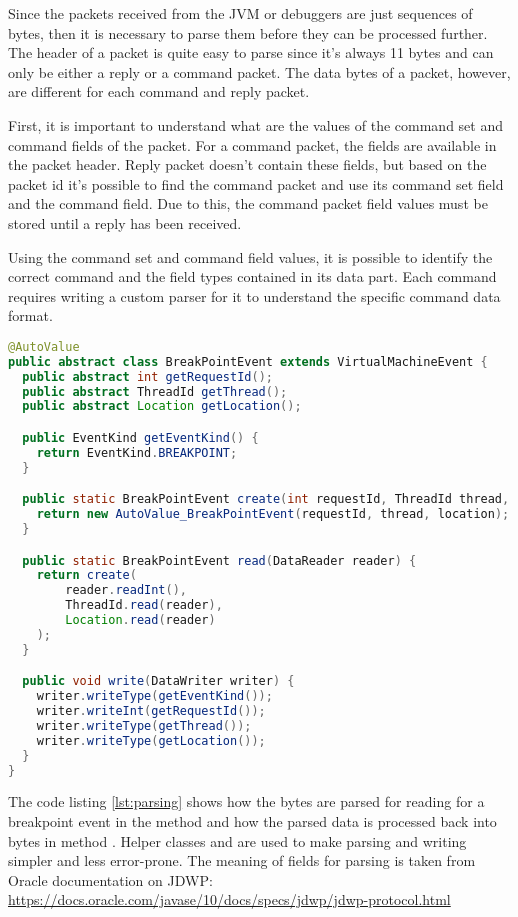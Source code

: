\documentclass[..thesis.tex]{subfiles}
\begin{document}
Since the packets received from the JVM or debuggers are just sequences of bytes, then it is necessary to parse them before they can be processed further.
The header of a packet is quite easy to parse since it's always 11 bytes and can only be either a reply or a command packet.
The data bytes of a packet, however, are different for each command and reply packet.

First, it is important to understand what are the values of the command set and command fields of the packet. 
For a command packet, the fields are available in the packet header.
Reply packet doesn't contain these fields, but based on the packet id it's possible to find the command packet and use its command set field and the command field.
Due to this, the command packet field values must be stored until a reply has been received. 

Using the command set and command field values, it is possible to identify the correct command and the field types contained in its data part.
Each command requires writing a custom parser for it to understand the specific command data format.

\begin{lstlisting}[language=java, caption={\textit{Breakpoint event representation as a class with read and write methods for reading and writing the bytes for the packet data field.}},captionpos=b, label={lst:parsing}]
@AutoValue
public abstract class BreakPointEvent extends VirtualMachineEvent {
  public abstract int getRequestId();
  public abstract ThreadId getThread();
  public abstract Location getLocation();

  public EventKind getEventKind() {
    return EventKind.BREAKPOINT;
  }

  public static BreakPointEvent create(int requestId, ThreadId thread, Location location) {
    return new AutoValue_BreakPointEvent(requestId, thread, location);
  }

  public static BreakPointEvent read(DataReader reader) {
    return create(
        reader.readInt(),
        ThreadId.read(reader),
        Location.read(reader)
    );
  }

  public void write(DataWriter writer) {
    writer.writeType(getEventKind());
    writer.writeInt(getRequestId());
    writer.writeType(getThread());
    writer.writeType(getLocation());
  }
}
\end{lstlisting}

The code listing \ref{lst:parsing} shows how the bytes are parsed for reading for a breakpoint event in the method  and how the parsed data is processed back into bytes in method .
Helper classes  and  are used to make parsing and writing simpler and less error-prone.
The meaning of fields for parsing is taken from Oracle documentation on JDWP: \url{https://docs.oracle.com/javase/10/docs/specs/jdwp/jdwp-protocol.html} 
\end{document}
